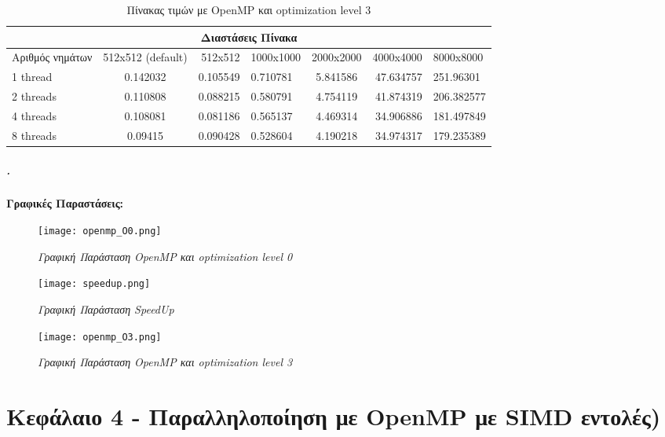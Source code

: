\documentclass[greek,booktabs,8pt,flagBlueCMYK]{report}
\begin{document}
\begin{table}[H]
\begin{center}
\label{tab:6} 
\begin{tabular}{| l | c | r | l | c | r | l |}
  \hline
  \multicolumn{7}{|c|}{Διαστάσεις Πίνακα} \\ \hline
  Αριθμός νημάτων & 512x512 (default) & 512x512 & 1000x1000 & 2000x2000 & 4000x4000 & 8000x8000\\ \hline 
  1 thread   & 0.142032 &	0.105549 &	0.710781 &	5.841586 &	47.634757 &  251.96301 \\ \hline
  2 threads  & 0.110808 &	0.088215 &	0.580791 &	4.754119 &	41.874319 &  206.382577 \\ \hline
  4 threads  & 0.108081 &	0.081186 &	0.565137 &	4.469314 &	34.906886 &  181.497849 \\ \hline
  8 threads  & 0.09415 &	0.090428 &	0.528604 &	4.190218 &	34.974317 &  179.235389 \\ \hline
\end{tabular}
\caption {Πίνακας τιμών με OpenMP και optimization level 3}
\end{center}
\end{table}

\paragraph{.} \textbf{Γραφικές Παραστάσεις:}\newline

\begin{figure}[ht]
\centering
\label{fig:table_serial}
\texttt{[image: openmp\_O0.png]}
\caption{\textit{Γραφική Παράσταση OpenMP και optimization level 0}}
\end{figure}

\begin{figure}[ht]
\centering
\label{fig:table_serial}
\texttt{[image: speedup.png]}
\caption{\textit{Γραφική Παράσταση SpeedUp}}
\end{figure}

\begin{figure}[ht]
\centering
\label{fig:table_serial}
\texttt{[image: openmp\_O3.png]}
\caption{\textit{Γραφική Παράσταση OpenMP και optimization level 3}}
\end{figure}

\chapter{Κεφάλαιο 4 - Παραλληλοποίηση με OpenMP με SIMD εντολές)}
\end{document}
